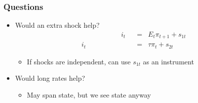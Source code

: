 \documentclass{beamer}
\begin{document}
\begin{frame}
\frametitle{Questions}
\begin{itemize}
\item Would an extra shock help?
\begin{align*}
    \phantom{xxxxxxxxxx}
    i_t &\;\;=\;\; E_t \pi_{t+1}+  s_{1t}  \tag{Fisher equation} \\
    i_t &\;\;=\;\; \tau \pi_{t} +  s_{2t} \tag{Taylor rule}
\end{align*}
\begin{itemize}
\item If shocks are independent, can use $s_{1t}$ as an instrument
\end{itemize}
\item Would long rates help?
\begin{itemize}
\item May span state, but we see state anyway
\end{itemize}
\end{itemize}
\end{frame}
\end{document}
